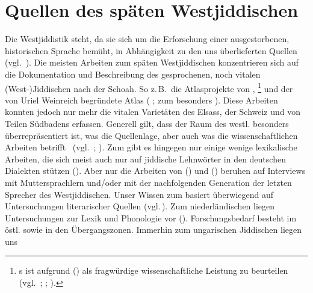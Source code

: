 \chapter{Quellen des späten Westjiddischen}\label{chap:quellenkapitel}
  
  \noindent Die Westjiddistik steht, da sie sich um die Erforschung einer ausgestorbenen, historischen Sprache bemüht, in Abhängigkeit zu den uns überlieferten Quellen (vgl.\, \citealt{Weinreich1953}). Die meisten Arbeiten zum späten Westjiddischen konzentrieren sich auf die Dokumentation und Beschreibung des gesprochenen, noch vitalen (West-)Jiddischen nach der Schoah. So z.\,B.\, die Atlasprojekte von \cite{GuggenheimGruenberg1973}, \cite{Beraneck1965}\footnote{\citeauthor{Beraneck1965}s  ist aufgrund  (\citealt[1020]{Katz1983}) als fragwürdige wissenschaftliche Leistung zu beurteilen (vgl.\, \citealt{GuggenheimGruenberg1966b,GuggenheimGruenberg1968}; \citealt[1377—1378]{Althaus1972}; \citealt[1020]{Katz1983}).} und der  von Uriel Weinreich begründete Atlas  (\citealt{Herzog1992} \citeyear{Herzog1992,Herzog1995,Herzog2000}; zum \hai{{\WJ}} besonders \citealt{Zuckerman1969}). Diese Arbeiten konnten jedoch nur mehr die vitalen Varietäten des Elsass, der Schweiz und von Teilen Südbadens erfassen. Generell gilt, dass der Raum des westl. \hai{{\SWJ}} besonders überrepräsentiert ist, was die Quellenlage, aber auch was die wissenschaftlichen Arbeiten betrifft \,%
  (vgl.\, \citealt{Weiss1896,GuggenheimGruenberg1958,GuggenheimGruenberg1966,GuggenheimGruenberg1973,GuggenheimGruenberg1976,GuggenheimGruenberg1981,Zuckerman1969,Brosi1990,Fleischer2004,Fleischer2004b,Fleischer2005,Schaefer2008,Schaefer2014}{; }\citealt{Weisskirchen2011}). Zum \hai{{\ZWJ}} gibt es hingegen nur einige wenige lexikalische Arbeiten, die sich meist auch nur auf jiddische Lehnwörter in den deutschen Dialekten stützen (\citealt{Frank1962,Weinberg1973,Althaus1963,Post1992,Klepsch2004}). Aber nur die Arbeiten von \cite{Frank1962} (\hai{{\ZWJ}}) und \cite{Weinberg1973} (\hai{{\NWJ}}) beruhen auf Interviews mit Muttersprachlern und/oder mit der nachfolgenden Generation der letzten Sprecher des Westjiddischen. Unser Wissen zum \hai{{\NWJ}} basiert überwiegend auf Untersuchungen  literarischer Quellen (vgl.\,\citealt{Landau1901,Reershemius2007,Reershemius2014,Schaefer2013}). Zum niederländischen \hai{{\NWJ}} liegen Untersuchungen zur Lexik und Phonologie vor (\citealt{VanGinneken,VoorzangerPolak1915,Beem1954,Beem1970,Beem1974,Beem1975,Aptroot1991,Aptroot2002}). Forschungsbedarf besteht im östl. \hai{{\SWJ}} sowie in den Übergangszonen. Immerhin zum ungarischen Jiddischen liegen uns \,%

